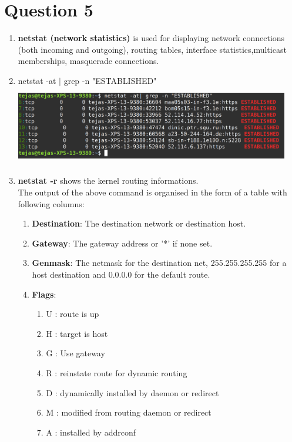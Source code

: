 \documentclass[a4paper,11pt]{article}
\begin{document}
\section*{Question 5}
\begin{enumerate}[itemsep=-3pt,label=(\alph*)]
	\item \textbf{netstat (network statistics)} is used for displaying network connections (both incoming and outgoing), routing tables, interface statistics,multicast memberships, masquerade connections. 
	\item netstat -at $|$ grep -n "ESTABLISHED"\\
	\includegraphics[height=35mm,width=120mm]{tcp_net}
	\item \textbf{netstat -r} shows the kernel routing informations.\\
	The output of the above command is organised in the form of a table with following columns:\vspace{-2mm}
	\begin{enumerate}[itemsep=0pt,label=(\roman*)]
		\item \textbf{Destination}: The destination network or destination host.
		\item \textbf{Gateway}: The gateway address or ’*’ if none set.
		\item \textbf{Genmask}: The netmask for the destination net, 255.255.255.255 for a host destination and 0.0.0.0 for the default route.
		\item \textbf{Flags}:\vspace{-1mm}
		\begin{enumerate}[itemsep=0pt,label=(\arabic*)]
			\item U : route is up
			\item H : target is host 
			\item G : Use gateway 
			\item R : reinstate route for dynamic routing
			\item D : dynamically installed by daemon or redirect 
			\item M : modified from routing daemon or redirect
			\item A : installed by addrconf 

\end{enumerate}
\end{enumerate}
\end{enumerate}
\end{document}
